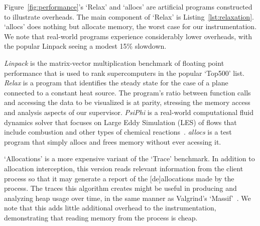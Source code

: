 Figure~\ref{fig:performance}'s `Relax' and `allocs' are artificial
programs constructed to illustrate overheads.  The
main component of `Relax' is Listing~\ref{lst:relaxation}. `allocs'
does nothing but allocate memory, the worst case for our
instrumentation.  We note that real-world programs experience
considerably lower overheads, with the popular Linpack seeing a modest
15\% slowdown.

\textit{Linpack} is the matrix-vector multiplication benchmark of
floating point performance that is used to rank supercomputers in the
popular `Top500' list. \textit{Relax} is a program that identifies
the steady state for the case of a plane connected to a constant heat
source.  The program's ratio between function calls and accessing the
data to be visualized is at parity, stressing the memory access and
analysis aspects of our supervisor. \textit{PsiPhi} is a real-world
computational fluid dynamics solver that focuses on Large Eddy
Simulation (LES) of flows that include combustion and other types of
chemical reactions~\cite{Proch:2014:PsiPhi}. \textit{allocs} is a test
program that simply allocs and frees memory without ever acessing it.

`Allocations' is a more expensive variant of the `Trace' benchmark.
In addition to allocation interception, this version reads relevant
information from the client process so that it may generate a report
of the [de]allocations made by the process.  The traces this algorithm
creates might be useful in producing and analyzing heap usage over
time, in the same manner as Valgrind's
`Massif'~\cite{Nethercote:2006:Massif}.  We note that this adds little
additional overhead to the instrumentation, demonstrating that reading
memory from the process is cheap.


